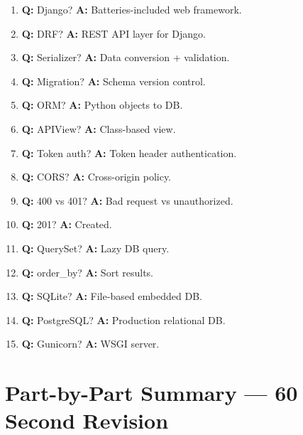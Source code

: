 \begin{enumerate}[label=\arabic*.]
\item \textbf{Q:} Django? \textbf{A:} Batteries-included web framework.
\item \textbf{Q:} DRF? \textbf{A:} REST API layer for Django.
\item \textbf{Q:} Serializer? \textbf{A:} Data conversion + validation.
\item \textbf{Q:} Migration? \textbf{A:} Schema version control.
\item \textbf{Q:} ORM? \textbf{A:} Python objects to DB.
\item \textbf{Q:} APIView? \textbf{A:} Class-based view.
\item \textbf{Q:} Token auth? \textbf{A:} Token header authentication.
\item \textbf{Q:} CORS? \textbf{A:} Cross-origin policy.
\item \textbf{Q:} 400 vs 401? \textbf{A:} Bad request vs unauthorized.
\item \textbf{Q:} 201? \textbf{A:} Created.
\item \textbf{Q:} QuerySet? \textbf{A:} Lazy DB query.
\item \textbf{Q:} order\_by? \textbf{A:} Sort results.
\item \textbf{Q:} SQLite? \textbf{A:} File-based embedded DB.
\item \textbf{Q:} PostgreSQL? \textbf{A:} Production relational DB.
\item \textbf{Q:} Gunicorn? \textbf{A:} WSGI server.
\end{enumerate}

\section{Part-by-Part Summary --- 60 Second Revision}

